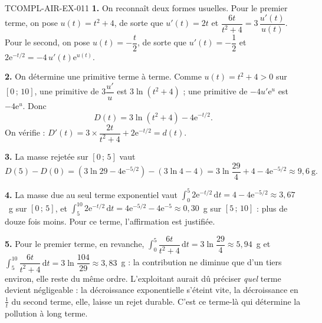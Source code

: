 \begin{corrige}{TCOMPL-AIR-EX-011}
\textbf{1.} On reconnaît deux formes usuelles. Pour le premier terme, on pose
$u(t)=t^2+4$, de sorte que
$u'(t)=2t$ et $\dfrac{6t}{t^2+4}=3\,\dfrac{u'(t)}{u(t)}$. Pour le second, on pose
$u(t)=-\dfrac{t}{2}$, de sorte que $u'(t)=-\dfrac12$ et
$2\mathrm{e}^{-t/2}=-4\,u'(t)\mathrm{e}^{u(t)}$.

\textbf{2.} On détermine une primitive terme à terme. Comme $u(t)=t^2+4>0$ sur
$[0\,;\,10]$, une primitive de
$3\dfrac{u'}{u}$ est $3\ln(t^2+4)$ ; une primitive de $-4u'\mathrm{e}^{u}$ est
$-4\mathrm{e}^{u}$. Donc
\[
  D(t)=3\ln\!\left(t^2+4\right)-4\mathrm{e}^{-t/2}.
\]
On vérifie : $D'(t)=3\times\dfrac{2t}{t^2+4}+2\mathrm{e}^{-t/2}=d(t)$.

\textbf{3.} La masse rejetée sur $[0\,;\,5]$ vaut
\[
  D(5)-D(0)=\left(3\ln 29-4\mathrm{e}^{-5/2}\right)-\left(3\ln 4-4\right)
  =3\ln\!\dfrac{29}{4}+4-4\mathrm{e}^{-5/2}\approx 9{,}6\ \text{g}.
\]

\textbf{4.} La masse due au seul terme exponentiel vaut
$\int_0^5 2\mathrm{e}^{-t/2}\,\mathrm{d}t=4-4\mathrm{e}^{-5/2}\approx 3{,}67$~g sur
$[0\,;\,5]$, et $\int_5^{10} 2\mathrm{e}^{-t/2}\,\mathrm{d}t
=4\mathrm{e}^{-5/2}-4\mathrm{e}^{-5}\approx 0{,}30$~g sur $[5\,;\,10]$ : plus de
douze fois moins. Pour ce terme, l'affirmation est justifiée.

\textbf{5.} Pour le premier terme, en revanche,
$\int_0^5\dfrac{6t}{t^2+4}\,\mathrm{d}t=3\ln\dfrac{29}{4}\approx 5{,}94$~g et
$\int_5^{10}\dfrac{6t}{t^2+4}\,\mathrm{d}t=3\ln\dfrac{104}{29}\approx 3{,}83$~g :
la contribution ne diminue que d'un tiers environ, elle reste du même ordre.
L'exploitant aurait dû préciser \emph{quel} terme devient négligeable : la
décroissance exponentielle s'éteint vite, la décroissance en $\frac{1}{t}$ du
second terme, elle, laisse un rejet durable. C'est ce terme-là qui détermine la
pollution à long terme.
\end{corrige}
